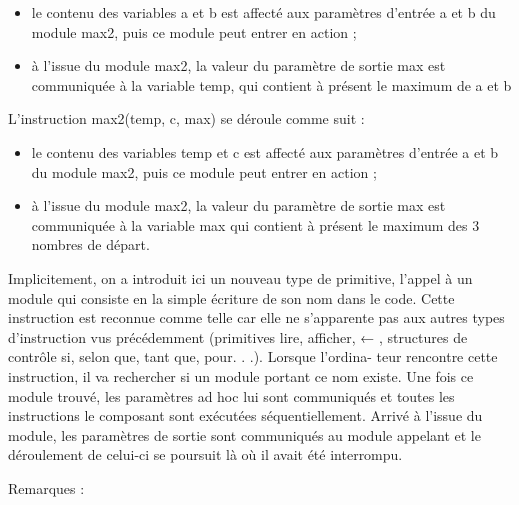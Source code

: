 \documentclass[11pt,a4paper]{article}
\begin{document}
					\begin{itemize}
				
			\item le contenu des variables a et b est affect\'e aux param\`etres d'entr\'ee a et b du module max2, puis ce module peut entrer en action ;
			\item \`a l'issue du module max2, la valeur du param\`etre de sortie max est communiqu\'ee \`a la variable temp, qui contient \`a pr\'esent le maximum de a et b
					\end{itemize}
				
            \par
        
        L'instruction max2(temp, c, max) se d\'eroule comme suit :
        
					\begin{itemize}
				
			\item le contenu des variables temp et c est affect\'e aux param\`etres d'entr\'ee a et b du module max2, puis ce module peut entrer en action ;
			\item \`a l'issue du module max2, la valeur du param\`etre de sortie max est communiqu\'ee \`a la variable max qui contient \`a pr\'esent le maximum des 3 nombres de d\'epart.
					\end{itemize}
				
            \par
        
        Implicitement, on a introduit ici un nouveau type de primitive, l'appel \`a un module qui
        consiste en la simple \'ecriture de son nom dans le code. Cette instruction est reconnue comme
        telle car elle ne s'apparente pas aux autres types d'instruction vus pr\'ec\'edemment (primitives
        lire, afficher, ← , structures de contr\^ole si, selon que, tant que, pour. . .). Lorsque l'ordina-
        teur rencontre cette instruction, il va rechercher si un module portant ce nom existe. Une
        fois ce module trouv\'e, les param\`etres ad hoc lui sont communiqu\'es et toutes les instructions
        le composant sont ex\'ecut\'ees s\'equentiellement. Arriv\'e \`a l'issue du module, les param\`etres de
        sortie sont communiqu\'es au module appelant et le d\'eroulement de celui-ci se poursuit l\`a o\`u
        il avait \'et\'e interrompu.
      
            \par
        
        Remarques : 
        
\end{document}
